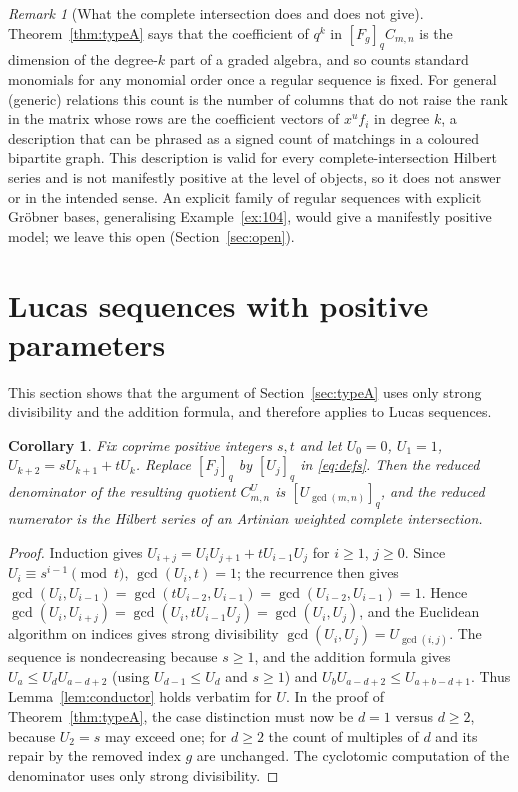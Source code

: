 \documentclass[11pt,a4paper]{article}
\newtheorem{corollary}[theorem]{Corollary}
\theoremstyle{definition}\newtheorem{definition}[theorem]{Definition}
\theoremstyle{remark}\newtheorem{remark}[theorem]{Remark}\newtheorem{example}[theorem]{Example}
\numberwithin{equation}{section}
\begin{document}
\begin{remark}[What the complete intersection does and does not give]\label{rem:counting}
Theorem~\ref{thm:typeA} says that the coefficient of $q^k$ in $[F_g]_qC_{m,n}$ is the dimension of the degree-$k$ part of a graded algebra, and so counts standard monomials for any monomial order once a regular sequence is fixed. For general (generic) relations this count is the number of columns that do not raise the rank in the matrix whose rows are the coefficient vectors of $x^uf_i$ in degree $k$, a description that can be phrased as a signed count of matchings in a coloured bipartite graph. This description is valid for every complete-intersection Hilbert series and is not manifestly positive at the level of objects, so it does not answer \cite[Open Problem~4.3]{bck} or \cite[Problem~5.7]{connelly} in the intended sense. An explicit family of regular sequences with explicit Gr\"obner bases, generalising Example~\ref{ex:104}, would give a manifestly positive model; we leave this open (Section~\ref{sec:open}).
\end{remark}

\section{Lucas sequences with positive parameters}\label{sec:lucas}
This section shows that the argument of Section~\ref{sec:typeA} uses only strong divisibility and the addition formula, and therefore applies to Lucas sequences.

\begin{corollary}\label{cor:lucas}
Fix coprime positive integers $s,t$ and let $U_0=0$, $U_1=1$, $U_{k+2}=sU_{k+1}+tU_k$. Replace $[F_j]_q$ by $[U_j]_q$ in \eqref{eq:defs}. Then the reduced denominator of the resulting quotient $C^U_{m,n}$ is $[U_{\gcd(m,n)}]_q$, and the reduced numerator is the Hilbert series of an Artinian weighted complete intersection.
\end{corollary}
\begin{proof}
Induction gives $U_{i+j}=U_iU_{j+1}+tU_{i-1}U_j$ for $i\ge1$, $j\ge0$. Since $U_i\equiv s^{i-1}\pmod t$, $\gcd(U_i,t)=1$; the recurrence then gives $\gcd(U_i,U_{i-1})=\gcd(tU_{i-2},U_{i-1})=\gcd(U_{i-2},U_{i-1})=1$. Hence $\gcd(U_i,U_{i+j})=\gcd(U_i,tU_{i-1}U_j)=\gcd(U_i,U_j)$, and the Euclidean algorithm on indices gives strong divisibility $\gcd(U_i,U_j)=U_{\gcd(i,j)}$. The sequence is nondecreasing because $s\ge1$, and the addition formula gives $U_a\le U_dU_{a-d+2}$ (using $U_{d-1}\le U_d$ and $s\ge1$) and $U_bU_{a-d+2}\le U_{a+b-d+1}$. Thus Lemma~\ref{lem:conductor} holds verbatim for $U$. In the proof of Theorem~\ref{thm:typeA}, the case distinction must now be $d=1$ versus $d\ge2$, because $U_2=s$ may exceed one; for $d\ge2$ the count of multiples of $d$ and its repair by the removed index $g$ are unchanged. The cyclotomic computation of the denominator uses only strong divisibility.
\end{proof}
\end{document}
